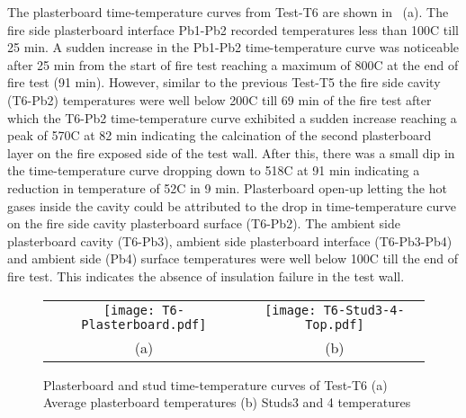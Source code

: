 The plasterboard time-temperature curves from Test-T6 are shown in ~(a). The fire side plasterboard interface Pb1-Pb2 recorded temperatures less than 100\degree C till 25 min. A sudden increase in the Pb1-Pb2 time-temperature curve was noticeable after 25 min from the start of fire test reaching a maximum of 800\degree C at the end of fire test (91 min). However, similar to the previous Test-T5 the fire side cavity (T6-Pb2) temperatures were well below 200\degree C till 69 min of the fire test after which the T6-Pb2 time-temperature curve exhibited a sudden increase reaching a peak of 570\degree C at 82 min indicating the calcination of the second plasterboard layer on the fire exposed side of the test wall. After this, there was a small dip in the time-temperature curve dropping down to 518\degree C at 91 min indicating a reduction in temperature of 52\degree C in 9 min. Plasterboard open-up letting the hot gases inside the cavity could be attributed to the drop in time-temperature curve on the fire side cavity plasterboard surface (T6-Pb2). The ambient side plasterboard cavity (T6-Pb3), ambient side plasterboard interface (T6-Pb3-Pb4) and ambient side (Pb4) surface temperatures were well below 100\degree C till the end of fire test. This indicates the absence of insulation failure in the test wall.
\begin{figure}[!htbp]
	\centering	
		\begin{tabular}{cc}
			\texttt{[image: T6-Plasterboard.pdf]} & \texttt{[image: T6-Stud3-4-Top.pdf]} \\
			(a) & (b) \\
			\end{tabular}
		\caption{Plasterboard and stud time-temperature curves of Test-T6 (a) Average plasterboard temperatures (b) Studs3 and 4 temperatures}
		\label{fig:T6-time-temperature}
\end{figure}

